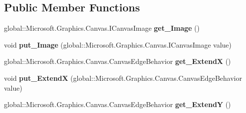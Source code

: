 \subsection*{Public Member Functions}
\begin{DoxyCompactItemize}
\item 
\mbox{\label{interface_microsoft_1_1_graphics_1_1_canvas_1_1_brushes_1_1_i_canvas_image_brush_a0a2e397b21701c2009442817061aea19}} 
global\+::\+Microsoft.\+Graphics.\+Canvas.\+I\+Canvas\+Image {\bfseries get\+\_\+\+Image} ()
\item 
\mbox{\label{interface_microsoft_1_1_graphics_1_1_canvas_1_1_brushes_1_1_i_canvas_image_brush_adce6e5d6d2750a7392b5352faf3f5f4d}} 
void {\bfseries put\+\_\+\+Image} (global\+::\+Microsoft.\+Graphics.\+Canvas.\+I\+Canvas\+Image value)
\item 
\mbox{\label{interface_microsoft_1_1_graphics_1_1_canvas_1_1_brushes_1_1_i_canvas_image_brush_aa972b7d23b8fc1eb398d518a07940b35}} 
global\+::\+Microsoft.\+Graphics.\+Canvas.\+Canvas\+Edge\+Behavior {\bfseries get\+\_\+\+ExtendX} ()
\item 
\mbox{\label{interface_microsoft_1_1_graphics_1_1_canvas_1_1_brushes_1_1_i_canvas_image_brush_a5355b52f83105ebc903d8a09622319eb}} 
void {\bfseries put\+\_\+\+ExtendX} (global\+::\+Microsoft.\+Graphics.\+Canvas.\+Canvas\+Edge\+Behavior value)
\item 
\mbox{\label{interface_microsoft_1_1_graphics_1_1_canvas_1_1_brushes_1_1_i_canvas_image_brush_aa40db9376b341ac0233a6f2984cff951}} 
global\+::\+Microsoft.\+Graphics.\+Canvas.\+Canvas\+Edge\+Behavior {\bfseries get\+\_\+\+ExtendY} ()
\item 
\mbox{\label{interface_microsoft_1_1_graphics_1_1_canvas_1_1_brushes_1_1_i_canvas_image_brush_a02ac0206445780a5997e968f76eeb0f0}} 

\end{DoxyCompactItemize}
